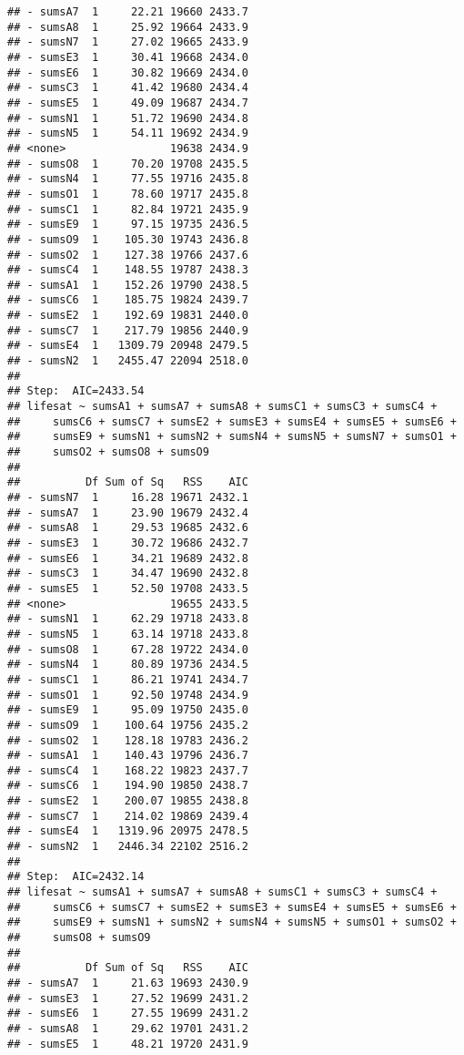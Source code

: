 \documentclass[,man,floatsintext]{apa6}
\begin{document}
\begin{verbatim}
## - sumsA7  1     22.21 19660 2433.7
## - sumsA8  1     25.92 19664 2433.9
## - sumsN7  1     27.02 19665 2433.9
## - sumsE3  1     30.41 19668 2434.0
## - sumsE6  1     30.82 19669 2434.0
## - sumsC3  1     41.42 19680 2434.4
## - sumsE5  1     49.09 19687 2434.7
## - sumsN1  1     51.72 19690 2434.8
## - sumsN5  1     54.11 19692 2434.9
## <none>                19638 2434.9
## - sumsO8  1     70.20 19708 2435.5
## - sumsN4  1     77.55 19716 2435.8
## - sumsO1  1     78.60 19717 2435.8
## - sumsC1  1     82.84 19721 2435.9
## - sumsE9  1     97.15 19735 2436.5
## - sumsO9  1    105.30 19743 2436.8
## - sumsO2  1    127.38 19766 2437.6
## - sumsC4  1    148.55 19787 2438.3
## - sumsA1  1    152.26 19790 2438.5
## - sumsC6  1    185.75 19824 2439.7
## - sumsE2  1    192.69 19831 2440.0
## - sumsC7  1    217.79 19856 2440.9
## - sumsE4  1   1309.79 20948 2479.5
## - sumsN2  1   2455.47 22094 2518.0
## 
## Step:  AIC=2433.54
## lifesat ~ sumsA1 + sumsA7 + sumsA8 + sumsC1 + sumsC3 + sumsC4 + 
##     sumsC6 + sumsC7 + sumsE2 + sumsE3 + sumsE4 + sumsE5 + sumsE6 + 
##     sumsE9 + sumsN1 + sumsN2 + sumsN4 + sumsN5 + sumsN7 + sumsO1 + 
##     sumsO2 + sumsO8 + sumsO9
## 
##          Df Sum of Sq   RSS    AIC
## - sumsN7  1     16.28 19671 2432.1
## - sumsA7  1     23.90 19679 2432.4
## - sumsA8  1     29.53 19685 2432.6
## - sumsE3  1     30.72 19686 2432.7
## - sumsE6  1     34.21 19689 2432.8
## - sumsC3  1     34.47 19690 2432.8
## - sumsE5  1     52.50 19708 2433.5
## <none>                19655 2433.5
## - sumsN1  1     62.29 19718 2433.8
## - sumsN5  1     63.14 19718 2433.8
## - sumsO8  1     67.28 19722 2434.0
## - sumsN4  1     80.89 19736 2434.5
## - sumsC1  1     86.21 19741 2434.7
## - sumsO1  1     92.50 19748 2434.9
## - sumsE9  1     95.09 19750 2435.0
## - sumsO9  1    100.64 19756 2435.2
## - sumsO2  1    128.18 19783 2436.2
## - sumsA1  1    140.43 19796 2436.7
## - sumsC4  1    168.22 19823 2437.7
## - sumsC6  1    194.90 19850 2438.7
## - sumsE2  1    200.07 19855 2438.8
## - sumsC7  1    214.02 19869 2439.4
## - sumsE4  1   1319.96 20975 2478.5
## - sumsN2  1   2446.34 22102 2516.2
## 
## Step:  AIC=2432.14
## lifesat ~ sumsA1 + sumsA7 + sumsA8 + sumsC1 + sumsC3 + sumsC4 + 
##     sumsC6 + sumsC7 + sumsE2 + sumsE3 + sumsE4 + sumsE5 + sumsE6 + 
##     sumsE9 + sumsN1 + sumsN2 + sumsN4 + sumsN5 + sumsO1 + sumsO2 + 
##     sumsO8 + sumsO9
## 
##          Df Sum of Sq   RSS    AIC
## - sumsA7  1     21.63 19693 2430.9
## - sumsE3  1     27.52 19699 2431.2
## - sumsE6  1     27.55 19699 2431.2
## - sumsA8  1     29.62 19701 2431.2
## - sumsE5  1     48.21 19720 2431.9

\end{verbatim}
\end{document}
